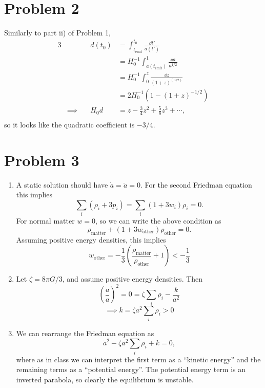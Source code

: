 \documentclass[12pt]{article}
\begin{document}
\section*{Problem 2}
Similarly to part ii) of Problem 1,
\begin{alignat*}{3}
    & \quad & d(t_0) &= \int_{t_\text{emit}}^{t_0}\frac{\dd t'}{a(t')} \\
    & \quad & &= H_0^{-1}\int_{a(t_\text{emit})}^1 \frac{\dd a}{a^{1/2}} \\
    & \quad & &= H_0^{-1}\int_0^z \frac{\dd z}{(1 + z)^{(3/2)}} \\
    & \quad & &= 2H_0^{-1}\left(1 - (1 + z)^{-1/2}\right) \\
    &\implies\quad & H_0d &= z - \frac{3}{4}z^2 + \frac{5}{8}z^3 + \cdots, \\
\end{alignat*}
so it looks like the quadratic coefficient is $-3/4$.

\section*{Problem 3}
\begin{enumerate}[label=(\alph*)]
    \item A static solution should have $\dot{a} = \ddot{a} = 0$. For the second Friedman equation this implies
    \[ \sum_i\left(\rho_i + 3p_i\right) = \sum_i(1 + 3w_i)\rho_i = 0. \]
    For normal matter $w = 0$, so we can write the above condition as
    \[ \rho_\text{matter} + (1 + 3w_\text{other})\rho_\text{other} = 0. \]
    Assuming positive energy densities, this implies
    \[ w_\text{other} = -\frac{1}{3}\left(\frac{\rho_\text{matter}}{\rho_\text{other}} + 1\right) < -\frac{1}{3} \]

    \item Let $\zeta = 8\pi G/3$, and assume positive energy densities. Then
    \[ \left(\frac{\dot{a}}{a}\right)^2 = 0 = \zeta\sum_i\rho_i - \frac{k}{a^2} \]
    \[ \implies k = \zeta a^2 \sum_i\rho_i > 0 \]

    \item We can rearrange the Friedman equation as
    \[ \dot{a}^2 - \zeta a^2 \sum_i\rho_i + k = 0, \]
    where as in class we can interpret the first term as a ``kinetic energy'' and the remaining terms as a ``potential energy''. The potential energy term is an inverted parabola, so clearly the equilibrium is unstable.
    
\end{enumerate}
\end{document}
